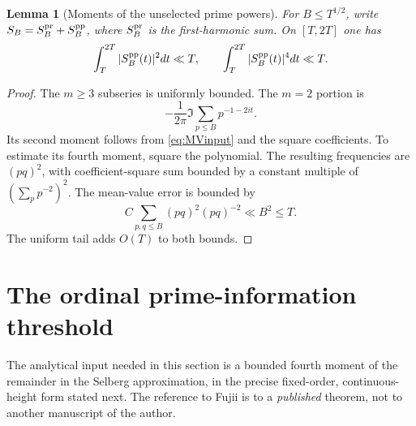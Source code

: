 \documentclass[11pt,reqno]{amsart}
\numberwithin{equation}{section}
\newtheorem{lemma}[theorem]{Lemma}
\begin{document}
\begin{lemma}[Moments of the unselected prime powers]\label{lem:primepowers}
For $B\le T^{1/2}$, write
$S_B=S_B^{\rm pr}+S_B^{\rm pp}$, where $S_B^{\rm pr}$ is the
first-harmonic sum.  On $[T,2T]$ one has
\begin{equation}\label{eq:pp2}
\int_T^{2T}|S_B^{\rm pp}(t)|^2dt\ll T,
\qquad \int_T^{2T}|S_B^{\rm pp}(t)|^4dt\ll T.
\end{equation}
\end{lemma}
\begin{proof}
The $m\ge3$ subseries is uniformly bounded.  The $m=2$ portion is
\[
-\frac1{2\pi}\Im\sum_{p\le B}p^{-1-2it}.
\]
Its second moment follows from \eqref{eq:MVinput} and the square
coefficients.  To estimate its fourth moment, square the polynomial.
The resulting frequencies are $(pq)^2$, with coefficient-square sum
bounded by a constant multiple of $(\sum_pp^{-2})^2$.
The mean-value error is bounded by
\[
C\sum_{p,q\le B}(pq)^2(pq)^{-2}
\ll B^2\le T.
\]
The uniform tail adds $O(T)$ to both bounds.
\end{proof}


\section{The ordinal prime-information threshold}\label{sec:threshold}
The analytical input needed in this section is a bounded fourth moment
of the remainder in the Selberg approximation, in the precise fixed-order,
continuous-height form stated next.  The reference to Fujii is to a
\emph{published} theorem, not to another manuscript of the author.
\end{document}

